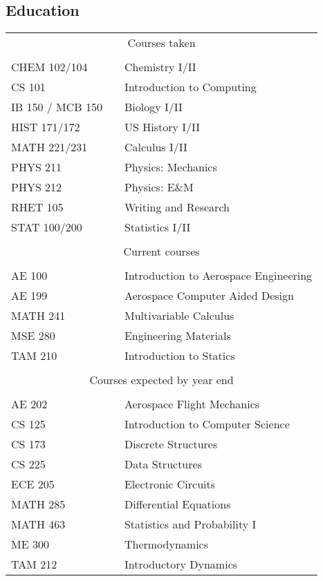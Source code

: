 \documentclass[margin]{res}
\begin{document}
\begin{resume}
\section{Education}
  \begin{tabular}{l p{1in} l}
    \\
    \multicolumn{3}{c}{Courses taken} \\
    \\
    CHEM 102/104 & \hfill & Chemistry I/II \\
    CS 101 & \hfill & Introduction to Computing \\
    IB 150 / MCB 150 & \hfill & Biology I/II \\
    HIST 171/172 & \hfill & US History I/II \\
    MATH 221/231 & \hfill & Calculus I/II \\
    PHYS 211 & \hfill & Physics: Mechanics \\
    PHYS 212 & \hfill & Physics: E\&M \\
    RHET 105 & \hfill & Writing and Research \\
    STAT 100/200 & \hfill & Statistics I/II \\
    \\
    \multicolumn{3}{c}{Current courses} \\
    \\
    AE 100 & \hfill & Introduction to Aerospace Engineering \\
    AE 199 & \hfill & Aerospace Computer Aided Design \\
    MATH 241 & \hfill & Multivariable Calculus \\
    MSE 280 & \hfill & Engineering Materials \\
    TAM 210 & \hfill & Introduction to Statics \\
    \\
    \multicolumn{3}{c}{Courses expected by year end} \\
    \\
    AE 202 & \hfill & Aerospace Flight Mechanics \\
    CS 125 & \hfill & Introduction to Computer Science \\
    CS 173 & \hfill & Discrete Structures \\
    CS 225 & \hfill & Data Structures \\
    ECE 205 & \hfill & Electronic Circuits \\
    MATH 285 & \hfill & Differential Equations \\
    MATH 463 & \hfill & Statistics and Probability I \\
    ME 300 & \hfill & Thermodynamics \\
    TAM 212 & \hfill & Introductory Dynamics \\
  \end{tabular}


\end{resume}
\end{document}

